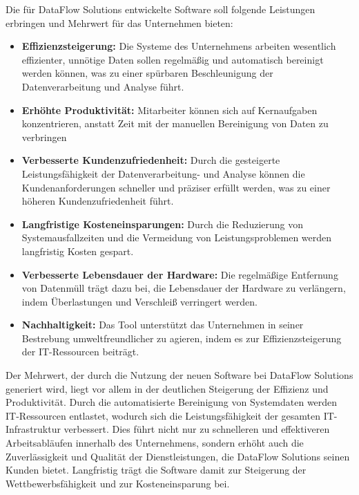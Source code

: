 Die für DataFlow Solutions entwickelte Software soll folgende Leistungen erbringen und Mehrwert für das Unternehmen bieten:

\begin{itemize}
\item \textbf{Effizienzsteigerung:} Die Systeme des Unternehmens arbeiten wesentlich effizienter, unnötige Daten sollen regelmäßig und automatisch bereinigt werden können, was zu einer spürbaren Beschleunigung der Datenverarbeitung und Analyse führt.

\item \textbf{Erhöhte Produktivität:} Mitarbeiter können sich auf Kernaufgaben konzentrieren, anstatt Zeit mit der manuellen Bereinigung von Daten zu verbringen

\item \sloppy
  \textbf{Verbesserte Kundenzufriedenheit:} Durch die gesteigerte Leistungsfähigkeit der Datenverarbeitung- und Analyse können die Kundenanforderungen schneller und präziser erfüllt werden, was zu einer höheren Kundenzufriedenheit führt.

\item \textbf{Langfristige Kosteneinsparungen:} Durch die Reduzierung von Systemausfallzeiten und die Vermeidung von Leistungsproblemen werden langfristig Kosten gespart.

\item \textbf{Verbesserte Lebensdauer der Hardware:} Die regelmäßige Entfernung von Datenmüll trägt dazu bei, die Lebensdauer der Hardware zu verlängern, indem Überlastungen und Verschleiß verringert werden.

\item \textbf{Nachhaltigkeit:} Das Tool unterstützt das Unternehmen in seiner Bestrebung umweltfreundlicher zu agieren, indem es zur Effizienzsteigerung der IT-Ressourcen beiträgt.
\end{itemize}

Der Mehrwert, der durch die Nutzung der neuen Software bei DataFlow Solutions generiert wird, liegt vor allem in der deutlichen Steigerung der Effizienz und Produktivität. Durch die automatisierte Bereinigung von Systemdaten werden IT-Ressourcen entlastet, wodurch sich die Leistungsfähigkeit der gesamten IT-Infrastruktur verbessert. Dies führt nicht nur zu schnelleren und effektiveren Arbeitsabläufen innerhalb des Unternehmens, sondern erhöht auch die Zuverlässigkeit und Qualität der Dienstleistungen, die DataFlow Solutions seinen Kunden bietet. Langfristig trägt die Software damit zur Steigerung der Wettbewerbsfähigkeit und zur Kosteneinsparung bei.